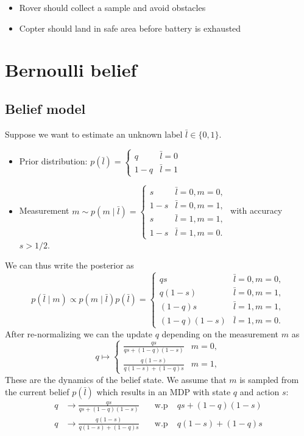 \documentclass[conference]{IEEEtran}
\begin{document}
\begin{itemize}
  \item Rover should collect a sample and avoid obstacles
  \item Copter should land in safe area before battery is exhausted
\end{itemize}

\section{Bernoulli belief}

\subsection{Belief model}

Suppose we want to estimate an unknown label $\bar l \in \{ 0,1 \}$.
\begin{itemize}
  \item Prior distribution: $p(\bar l) = \begin{cases}
    q   & \bar l=0 \\
    1-q & \bar l=1
  \end{cases}$
  \item Measurement $m \sim p(m \mid \bar l) = \begin{cases}
    s & \bar l=0, m = 0, \\
    1-s & \bar l=0, m=1, \\
    s & \bar l=1, m= 1, \\
    1-s & \bar l=1, m=0.
  \end{cases}$ with accuracy $s > 1/2$.
\end{itemize}
We can thus write the posterior as
\begin{equation}
  p(\bar l \mid m) \propto p(m \mid \bar l) p(\bar l) = \begin{cases}
    q s & \bar l=0, m=0, \\
    q(1-s) & \bar l=0, m=1, \\
    (1-q) s & \bar l=1, m=1, \\
    (1-q)(1-s) & \bar l=1, m=0.
  \end{cases}
\end{equation}
After re-normalizing we can the update $q$ depending on the measurement $m$ as 
\begin{equation}
  q \mapsto \begin{cases}
    \frac{qs}{qs + (1-q)(1-s)} & m = 0, \\
    \frac{q(1-s)}{q(1-s) + (1-q)s} & m = 1, 
  \end{cases}
\end{equation}
These are the dynamics of the belief state. We assume that $m$ is sampled from the current belief $p(\bar l)$ which results in an MDP with state $q$ and action $s$:
\begin{equation}
\label{eq:bernoulli_mdp}
\begin{aligned}
  q & \longrightarrow \frac{qs}{qs + (1-q)(1-s)} \quad &  \text{w.p} \; & qs + (1-q)(1-s) \\
  q & \longrightarrow \frac{q(1-s)}{q(1-s) + (1-q)s} \quad &  \text{w.p} \; & q(1-s) + (1-q)s 
\end{aligned}
\end{equation}
\end{document}
